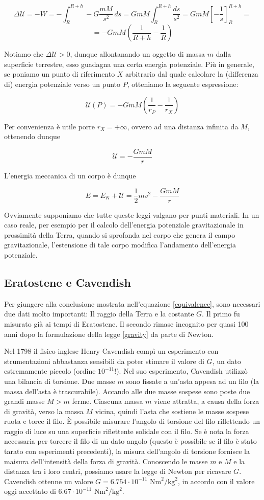 \[ \Delta\mathcal{U} = -W = -\int_{R}^{R + h}-G\frac{mM}{s^2}\,ds = GmM\int_{R}^{R+h}\frac{ds}{s^2} = GmM\left[ -\frac{1}{s} \right]_{R}^{R+h} =  \]
\[ = -GmM\left( \frac{1}{R + h} - \frac{1}{R} \right) \]

\noindent Notiamo che $\Delta\mathcal{U} > 0$, dunque allontanando un oggetto di massa
$m$ dalla superficie terrestre, esso guadagna una certa energia potenziale. Più in generale,
se poniamo un punto di riferimento $X$ arbitrario dal quale calcolare la (differenza di)
energia potenziale verso un punto $P$, otteniamo la seguente espressione:

\[ \mathcal{U}(P) = -GmM\left(\frac{1}{r_P} - \frac{1}{r_X}\right) \]

\noindent Per convenienza è utile porre $r_X = +\infty$, ovvero ad una distanza infinita da
$M$, ottenendo dunque

\[ \mathcal{U} = -\frac{GmM}{r} \]

\noindent L'energia meccanica di un corpo è dunque

\[ E = E_K + \mathcal{U} = \frac{1}{2}mv^2 -\frac{GmM}{r} \]

\noindent Ovviamente supponiamo che tutte queste leggi valgano per punti materiali.
In un caso reale, per esempio per il calcolo dell'energia potenziale gravitazionale
in prossimità della Terra, quando si sprofonda nel corpo che genera il campo
gravitazionale, l'estensione di tale corpo modifica l'andamento dell'energia potenziale.

\subsection{Eratostene e Cavendish}
Per giungere alla conclusione mostrata nell'equazione \ref{equivalence},
sono necessari due dati molto importanti: Il raggio della Terra e la
costante $G$. Il primo fu misurato già ai tempi di Eratostene. Il secondo
rimase incognito per quasi 100 anni dopo la formulazione della legge
\ref{gravity} da parte di Newton.

Nel 1798 il fisico inglese Henry Cavendish compì un esperimento con
strumentazioni abbastanza sensibili da poter stimare il valore di $G$,
un dato estremamente piccolo (ordine $10^{-11}$!). Nel suo esperimento,
Cavendish utilizzò una bilancia di torsione. Due masse $m$ sono fissate
a un'asta appesa ad un filo (la massa dell'asta è trascurabile).
Accando alle due masse sospese sono poste due grandi masse $M > m$ ferme.
Ciascuna massa $m$ viene attratta, a causa della forza di gravità,
verso la massa $M$ vicina, quindi l'asta che sostiene le masse sospese
ruota e torce il filo. È possibile misurare l'angolo di torsione del
filo riflettendo un raggio di luce su una superficie riflettente
solidale con il filo. Se è nota la forza necessaria per torcere il
filo di un dato angolo (questo è possibile se il filo è stato tarato
con esperimenti precedenti), la misura dell'angolo di torsione fornisce
la maisura dell'intensità della forza di gravità. Conoscendo le masse
$m$ e $M$ e la distanza tra i loro centri, possiamo usare la legge
di Newton per ricavare $G$.
Cavendish ottenne un valore $G = 6.754 \cdot 10^{-11} \text{ Nm}^2/\text{kg}^2$,
in accordo con il valore oggi accettato di $6.67 \cdot 10^{-11} \text{ Nm}^2/\text{kg}^2$.

